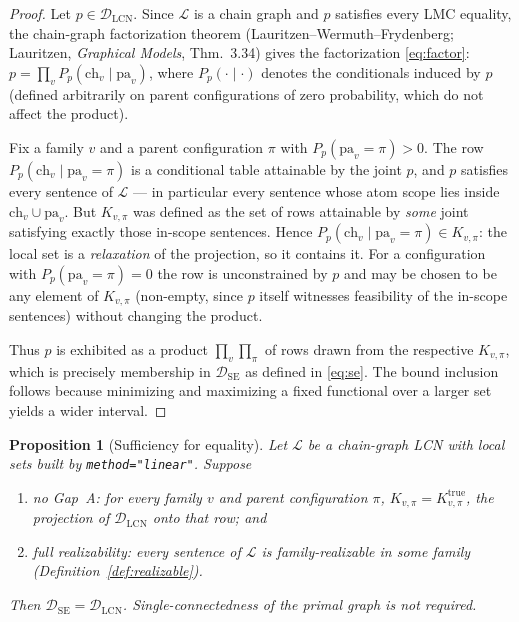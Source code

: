 \documentclass[11pt]{article}
\newtheorem{proposition}{Proposition}
\theoremstyle{definition}
\newcommand{\DSE}{\mathcal{D}_{\mathrm{SE}}}
\newcommand{\DLCN}{\mathcal{D}_{\mathrm{LCN}}}
\newcommand{\ch}{\mathrm{ch}}
\newcommand{\pa}{\mathrm{pa}}
\begin{document}
\begin{proof}
Let $p\in\DLCN$. Since $\mathcal L$ is a chain graph and $p$ satisfies every LMC equality, the
chain-graph factorization theorem (Lauritzen--Wermuth--Frydenberg; Lauritzen, \emph{Graphical
Models}, Thm.~3.34) gives the factorization \eqref{eq:factor}:
$p=\prod_v P_p(\ch_v\mid\pa_v)$, where $P_p(\cdot\mid\cdot)$ denotes the conditionals induced by $p$
(defined arbitrarily on parent configurations of zero probability, which do not affect the product).

Fix a family $v$ and a parent configuration $\pi$ with $P_p(\pa_v{=}\pi)>0$. The row
$P_p(\ch_v\mid\pa_v{=}\pi)$ is a conditional table attainable by the joint $p$, and $p$ satisfies
every sentence of $\mathcal L$ --- in particular every sentence whose atom scope lies inside
$\ch_v\cup\pa_v$. But $K_{v,\pi}$ was defined as the set of rows attainable by \emph{some} joint
satisfying exactly those in-scope sentences. Hence $P_p(\ch_v\mid\pa_v{=}\pi)\in K_{v,\pi}$: the
local set is a \emph{relaxation} of the projection, so it contains it. For a configuration with
$P_p(\pa_v{=}\pi)=0$ the row is unconstrained by $p$ and may be chosen to be any element of
$K_{v,\pi}$ (non-empty, since $p$ itself witnesses feasibility of the in-scope sentences) without
changing the product.

Thus $p$ is exhibited as a product $\prod_v\prod_\pi$ of rows drawn from the respective
$K_{v,\pi}$, which is precisely membership in $\DSE$ as defined in \eqref{eq:se}. The bound
inclusion follows because minimizing and maximizing a fixed functional over a larger set yields a
wider interval.
\end{proof}

\begin{proposition}[Sufficiency for equality]\label{prop:suff}
Let $\mathcal L$ be a chain-graph LCN with local sets built by \texttt{method="linear"}. Suppose
\begin{enumerate}
  \item[\textup{(A)}] \emph{no Gap~A:} for every family $v$ and parent configuration $\pi$,
    $K_{v,\pi}=K_{v,\pi}^{\mathrm{true}}$, the projection of $\DLCN$ onto that row; and
  \item[\textup{(B)}] \emph{full realizability:} every sentence of $\mathcal L$ is family-realizable
    in some family (Definition~\ref{def:realizable}).
\end{enumerate}
Then $\DSE=\DLCN$. \emph{Single-connectedness of the primal graph is not required.}
\end{proposition}
\end{document}
